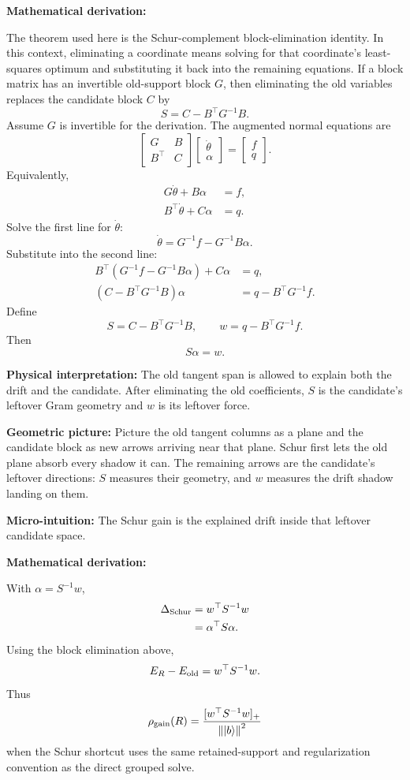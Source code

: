 \documentclass[10pt,twocolumn]{article}
\newcommand{\ket}[1]{\left|#1\right\rangle}
\newcommand{\norm}[1]{\left\lVert #1\right\rVert}
\newcommand{\micro}[1]{%
  \par\smallskip
  \noindent\textcolor{deepblue}{\textbf{Micro-intuition:}} #1
  \par\smallskip}
\newcommand{\deriv}{%
  \par\noindent\textcolor{deepviolet}{\textbf{Mathematical derivation:}}\par\vspace{-1mm}}
\newcommand{\phys}[1]{%
  \par\smallskip
  \noindent\textcolor{deepgreen}{\textbf{Physical interpretation:}} #1
  \par\smallskip}
\newcommand{\geom}[1]{%
  \par\smallskip
  \noindent\textcolor{deepviolet}{\textbf{Geometric picture:}} #1
  \par\smallskip}
\begin{document}
\deriv
The theorem used here is the Schur-complement block-elimination identity. In
this context, eliminating a coordinate means solving for that coordinate's
least-squares optimum and substituting it back into the remaining equations. If a
block matrix has an invertible old-support block \(G\), then eliminating the old
variables replaces the candidate block \(C\) by
\[
S=C-B^\top G^{-1}B.
\]
Assume \(G\) is invertible for the derivation. The augmented normal equations
are
\[
\begin{bmatrix}
G&B\\
B^\top&C
\end{bmatrix}
\begin{bmatrix}
\dot\theta\\
\alpha
\end{bmatrix}
=
\begin{bmatrix}
f\\
q
\end{bmatrix}.
\]
Equivalently,
\[
\begin{aligned}
G\dot\theta+B\alpha&=f,\\
B^\top\dot\theta+C\alpha&=q.
\end{aligned}
\]
Solve the first line for \(\dot\theta\):
\[
\dot\theta=G^{-1}f-G^{-1}B\alpha.
\]
Substitute into the second line:
\[
\begin{aligned}
B^\top(G^{-1}f-G^{-1}B\alpha)+C\alpha&=q,\\
(C-B^\top G^{-1}B)\alpha&=q-B^\top G^{-1}f.
\end{aligned}
\]
Define
\[
S=C-B^\top G^{-1}B,
\qquad
w=q-B^\top G^{-1}f.
\]
Then
\[
S\alpha=w.
\]

\phys{The old tangent span is allowed to explain both the drift and the
candidate. After eliminating the old coefficients, \(S\) is the candidate's
leftover Gram geometry and \(w\) is its leftover force.}

\geom{Picture the old tangent columns as a plane and the candidate block as new
arrows arriving near that plane. Schur first lets the old plane absorb every
shadow it can. The remaining arrows are the candidate's leftover directions:
\(S\) measures their geometry, and \(w\) measures the drift shadow landing on
them.}

\micro{The Schur gain is the explained drift inside that leftover candidate
space.}

\deriv
With \(\alpha=S^{-1}w\),
\[
\begin{aligned}
\Delta_{\rm Schur}
&=w^\top S^{-1}w\\
&=\alpha^\top S\alpha.
\end{aligned}
\]
Using the block elimination above,
\[
E_R-E_{\rm old}
=w^\top S^{-1}w.
\]
Thus
\[
\rho_{\rm gain}(R)
=
\frac{[w^\top S^{-1}w]_+}{\norm{\ket b}^2}
\]
when the Schur shortcut uses the same retained-support and regularization
convention as the direct grouped solve.
\end{document}
